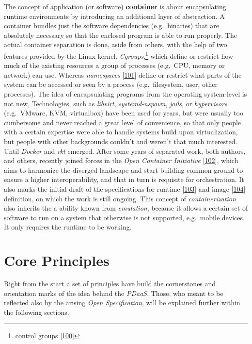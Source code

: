 \documentclass[12pt,english,a4paper,titlepage,cleardoublepage=empty,dottedtoc]{report}
\begin{document}
The concept of application (or software) \textbf{container} is about
encapsulating runtime environments by introducing an additional layer of
abstraction. A container bundles just the software dependencies
(e.g.~binaries) that are absolutely necessary so that the enclosed
program is able to run properly. The actual container separation is
done, aside from others, with the help of two features provided by the
Linux kernel. \emph{Cgroups},\footnote{control groups
  {[}\protect\hyperlink{ref-web_2015_cgroup-doc}{100}{]}} which define
or restrict how much of the existing resources a group of processes
(e.g.~CPU, memory or network) can use. Whereas \emph{namespaces}
{[}\protect\hyperlink{ref-web_2016_kernel-namespace}{101}{]} define or
restrict what parts of the system can be accessed or seen by a process
(e.g.~filesystem, user, other processes). The idea of encapsulating
programs from the operating system-level is not new, Technologies, such
as \emph{libvirt}, \emph{systemd-nspawn}, \emph{jails}, or
\emph{hypervisors} (e.g.~VMware, KVM, virtualbox) have been used for
years, but were usually too cumbersome and never reached a great level
of convenience, so that only people with a certain expertise were able
to handle systems build upon virtualization, but people with other
backgrounds couldn't and weren't that much interested. Until
\emph{Docker} and \emph{rkt} emerged. After some years of separated
work, both authors, and others, recently joined forces in the \emph{Open
Container Initiative}
{[}\protect\hyperlink{ref-web_2016_open-container-initiative}{102}{]},
which aims to harmonize the diverged landscape and start building common
ground to ensure a higher interoperability, and that in turn is
requisite for orchestration. It also marks the initial draft of the
specifications for runtime
{[}\protect\hyperlink{ref-web_oci-spec_runtime}{103}{]} and image
{[}\protect\hyperlink{ref-web_oci-spec_image}{104}{]} definition, on
which the work is still ongoing. This concept of \emph{containerization}
also inherits the a ability known from \emph{emulation}, because it
allows a certain set of software to run on a system that otherwise is
not supported, e.g.~mobile devices. It only requires the runtime to be
working.

\hypertarget{core-principles}{\chapter{Core
Principles}\label{core-principles}}

Right from the start a set of principles have build the cornerstones and
orientation marks of the idea behind the \emph{PDaaS}. Those, who meant
to be reflected also by the arising \emph{Open Specification}, will be
explained further within the following sections.
\end{document}
